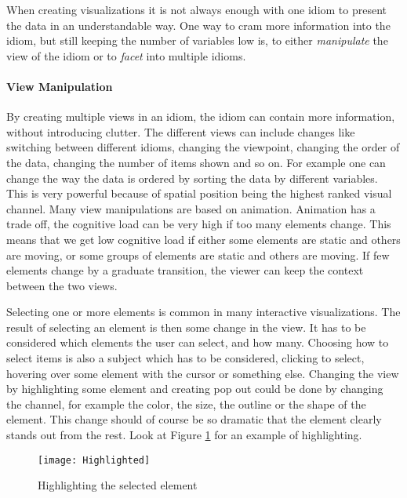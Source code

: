 \documentclass[Report.tex]{subfiles}
\begin{document}
When creating visualizations it is not always enough with one idiom to present the data in an understandable way. One way to cram more information into the idiom, but still keeping the number of variables low is, to either \emph{manipulate} the view of the idiom or to \emph{facet} into multiple idioms. 
\paragraph{View Manipulation\\}
By creating multiple views in an idiom, the idiom can contain more information, without introducing clutter. The different views can include changes like switching between different idioms, changing the viewpoint, changing the order of the data, changing the number of items shown and so on. For example one can change the way the data is ordered by sorting the data by different variables. This is very powerful because of spatial position being the highest ranked visual channel. Many view manipulations are based on animation. Animation has a trade off, the cognitive load can be very high if too many elements change. This means that we get low cognitive load if either some elements are static and others are moving, or some groups of elements are static and others are moving. If few elements change by a graduate transition, the viewer can keep the context between the two views. \cite[Chapter 11]{Tamara}

Selecting one or more elements is common in many interactive visualizations. The result of selecting an element is then some change in the view. It has to be considered which elements the user can select, and how many. Choosing how to select items is also a subject which has to be considered, clicking to select, hovering over some element with the cursor or something else. 
Changing the view by highlighting some element and creating pop out could be done by changing the channel, for example the color, the size, the outline or the shape of the element. This change should of course be so dramatic that the element clearly stands out from the rest. Look at Figure \ref{fig:highlighted} for an example of highlighting. \cite[Chapter 11]{Tamara}
\begin{figure}
\center
\texttt{[image: Highlighted]}
\caption{Highlighting the selected element}
\label{fig:highlighted}
\end{figure}
\end{document}
